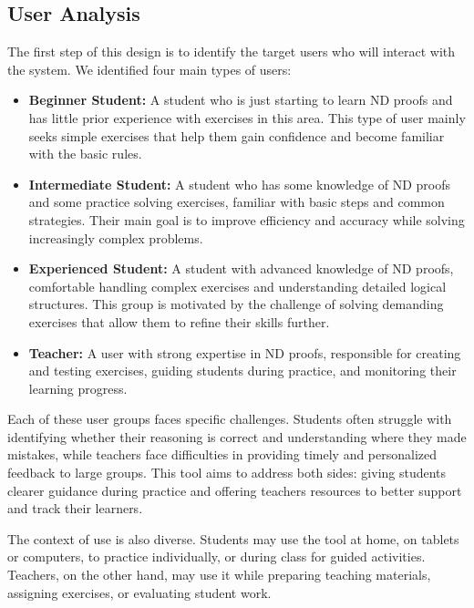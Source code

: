 \subsection{User Analysis}
\label{user-analysis}
The first step of this design is to identify the target users who will interact with the system. We identified four main types of users:

\begin{itemize}
\setlength{\itemsep}{5pt}
    \item \textbf{Beginner Student:} A student who is just starting to learn \gls{ND} proofs and has little prior experience with exercises in this area. This type of user mainly seeks simple exercises that help them gain confidence and become familiar with the basic rules.
    \item \textbf{Intermediate Student:} A student who has some knowledge of \gls{ND} proofs and some practice solving exercises, familiar with basic steps and common strategies. Their main goal is to improve efficiency and accuracy while solving increasingly complex problems.
    \item \textbf{Experienced Student:} A student with advanced knowledge of \gls{ND} proofs, comfortable handling complex exercises and understanding detailed logical structures. This group is motivated by the challenge of solving demanding exercises that allow them to refine their skills further.
    \item \textbf{Teacher:} A user with strong expertise in \gls{ND} proofs, responsible for creating and testing exercises, guiding students during practice, and monitoring their learning progress.
\end{itemize}

Each of these user groups faces specific challenges. Students often struggle with identifying whether their reasoning is correct and understanding where they made mistakes, while teachers face difficulties in providing timely and personalized feedback to large groups. This tool aims to address both sides: giving students clearer guidance during practice and offering teachers resources to better support and track their learners.  

The context of use is also diverse. Students may use the tool at home, on tablets or computers, to practice individually, or during class for guided activities. Teachers, on the other hand, may use it while preparing teaching materials, assigning exercises, or evaluating student work.  

